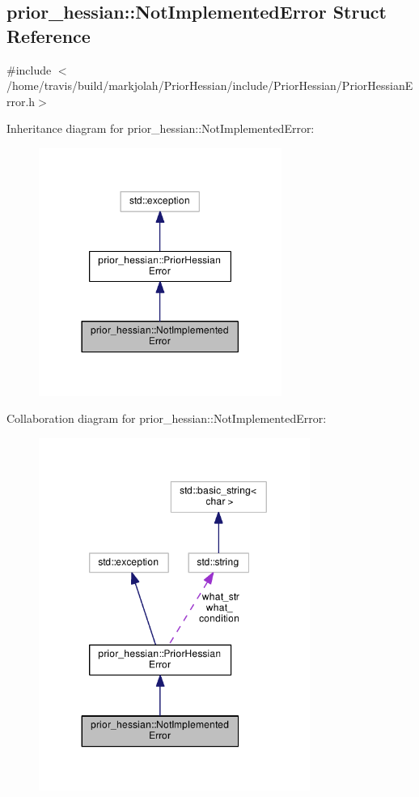 \hypertarget{structprior__hessian_1_1NotImplementedError}{}\subsection{prior\+\_\+hessian\+:\+:Not\+Implemented\+Error Struct Reference}
\label{structprior__hessian_1_1NotImplementedError}


{\ttfamily \#include $<$/home/travis/build/markjolah/\+Prior\+Hessian/include/\+Prior\+Hessian/\+Prior\+Hessian\+Error.\+h$>$}



Inheritance diagram for prior\+\_\+hessian\+:\+:Not\+Implemented\+Error\+:\nopagebreak
\begin{figure}[H]
\begin{center}
\leavevmode
\includegraphics[width=225pt]{structprior__hessian_1_1NotImplementedError__inherit__graph}
\end{center}
\end{figure}


Collaboration diagram for prior\+\_\+hessian\+:\+:Not\+Implemented\+Error\+:\nopagebreak
\begin{figure}[H]
\begin{center}
\leavevmode
\includegraphics[width=251pt]{structprior__hessian_1_1NotImplementedError__coll__graph}
\end{center}
\end{figure}
